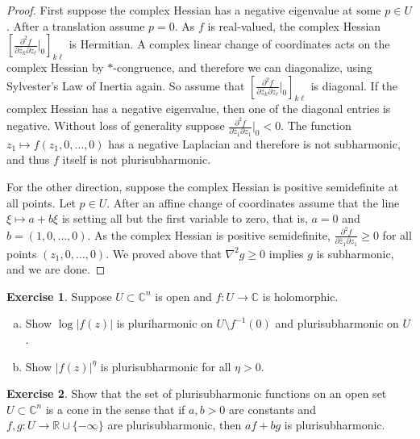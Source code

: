 \documentclass[12pt,openany]{book}
\newcommand{\sabs}[1]{\lvert {#1} \rvert}
\newcommand{\C}{{\mathbb{C}}}
\newcommand{\R}{{\mathbb{R}}}
\theoremstyle{plain}
\theoremstyle{remark}
\theoremstyle{definition}
\newenvironment{exbox}{%
    \def\FrameCommand{\vrule width 1pt \relax\hspace{10pt}}%
    \MakeFramed{\advance\hsize-\width\FrameRestore}%
}{%
    \endMakeFramed
}
\newenvironment{exparts}{%
    \leavevmode\begin{enumerate}[a),noitemsep,topsep=0pt,parsep=0pt,partopsep=0pt]
}{%
    \end{enumerate}
}
\theoremstyle{exercise}
\newtheorem{exercise}{Exercise}[section]
\theoremstyle{example}
\begin{document}
\begin{proof}
First suppose the complex Hessian has a negative eigenvalue at some $p \in U$.
After a translation assume $p=0$.
As $f$ is real-valued, the complex Hessian
$\left[
\frac{\partial^2 f}{\partial \bar{z}_k \partial z_\ell}
\Big|_0
\right]_{k\ell}$ is Hermitian.  A complex linear change of coordinates
acts on the complex Hessian by $*$-congruence, and therefore we can
diagonalize,
using Sylvester's Law of Inertia again.
So assume that
$\left[
\frac{\partial^2 f}{\partial \bar{z}_k \partial z_\ell}
\Big|_0
\right]_{k\ell}$ is diagonal.  If the complex Hessian has a negative eigenvalue, then
one of the diagonal entries is negative.
Without loss of generality suppose
$\frac{\partial^2 f}{\partial \bar{z}_1 \partial z_1}\Big|_0 < 0$.
The function $z_1 \mapsto f(z_1,0,\ldots,0)$ has
a negative Laplacian and therefore is not subharmonic, and thus $f$ itself
is not plurisubharmonic.

For the other direction, suppose the complex Hessian is positive
semidefinite at all points.
Let $p \in U$.  After an affine change of coordinates assume that the
line $\xi \mapsto a+b\xi$ is setting all but the first variable to
zero, that is, $a=0$ and $b=(1,0,\ldots,0)$.
As the complex Hessian is positive semidefinite,
$\frac{\partial^2 f}{\partial \bar{z}_1 \partial z_1} \geq 0$ for all
points $(z_1,0,\ldots,0)$.  We proved above that $\nabla^2 g \geq 0$
implies $g$ is subharmonic, and we are done.
\end{proof}

\begin{exbox}
\begin{exercise} \label{exercise:modholplush}
Suppose $U \subset \C^n$ is open and $f \colon U \to \C$ is holomorphic.
\begin{exparts}
\item
Show $\log \sabs{f(z)}$ is pluriharmonic on $U \setminus f^{-1}(0)$ and
plurisubharmonic on $U$.
\item
Show $\sabs{f(z)}^{\eta}$ is plurisubharmonic for all $\eta > 0$.
\end{exparts}
\end{exercise}

\begin{exercise}
Show that the set of plurisubharmonic functions on an open set $U \subset \C^n$
is a cone in the sense that if $a,b > 0$ are constants and
$f, g \colon U \to \R \cup \{ -\infty \}$ are plurisubharmonic, then
$a f + b g$ is plurisubharmonic.
\end{exercise}
\end{exbox}
\end{document}
